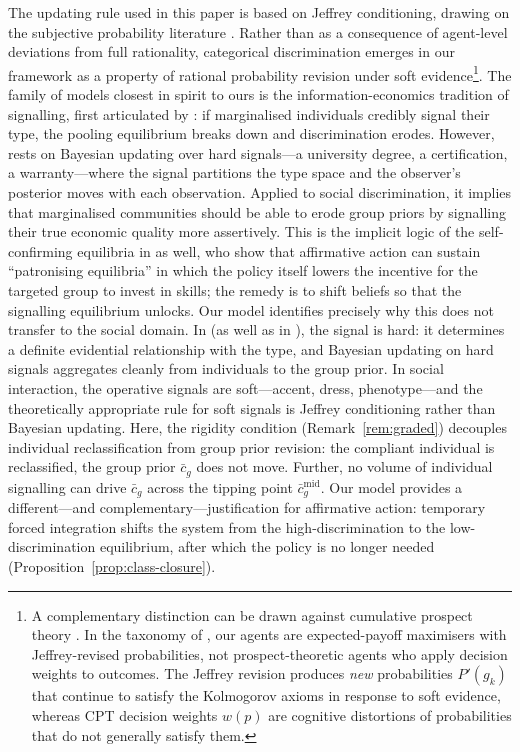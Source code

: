 \documentclass[pdflatex,sn-basic]{sn-jnl}
\theoremstyle{thmstyleone}
\numberwithin{proposition}{subsection}
\begin{document}
The updating rule used in this paper is based on Jeffrey
conditioning, drawing on the subjective probability literature
\citep{Jeffrey1965,Jeffrey2004}. Rather than as a consequence of
agent-level deviations from full rationality, categorical
discrimination emerges in our framework as a property of rational
probability revision under soft evidence\footnote{A complementary
distinction can be drawn against cumulative prospect theory
\citep{TverskyKahneman1992}. In the taxonomy of
\citet{Schoemaker1982}, our agents are expected-payoff maximisers
with Jeffrey-revised probabilities, not prospect-theoretic agents who
apply decision weights to outcomes. The Jeffrey revision produces
\emph{new} probabilities $P'(g_k)$ that continue to satisfy the
Kolmogorov axioms in response to soft evidence, whereas CPT decision
weights $w(p)$ are cognitive distortions of probabilities that do not
generally satisfy them.}.
The family of models closest in spirit to ours is the
information-economics tradition of signalling, first articulated by
\citet{Spence1973}: if marginalised individuals credibly signal their
type, the pooling equilibrium breaks down and discrimination erodes.
However, \citet{Spence1973} rests on Bayesian updating over hard
signals---a university degree, a certification, a warranty---where the
signal partitions the type space and the observer's posterior moves
with each observation. Applied to social discrimination, it implies
that marginalised communities should be able to erode group priors by
signalling their true economic quality more assertively. This is the
implicit logic of the self-confirming equilibria in
\citet{CoateLoury1993} as well, who show that affirmative action can
sustain ``patronising equilibria'' in which the policy itself lowers
the incentive for the targeted group to invest in skills; the remedy
is to shift beliefs so that the signalling equilibrium unlocks. Our
model identifies precisely why this does not transfer to the social
domain. In \citet{Spence1973} (as well as in \citet{Akerlof1970}),
the signal is hard: it determines a definite evidential relationship
with the type, and Bayesian updating on hard signals aggregates
cleanly from individuals to the group prior. In social interaction,
the operative signals are soft---accent, dress, phenotype---and the theoretically appropriate rule for soft signals is
Jeffrey conditioning rather than Bayesian updating. Here, the rigidity condition
(Remark~\ref{rem:graded}) decouples individual reclassification
from group prior revision: the compliant individual is reclassified,
the group prior $\bar{c}_g$ does not move. Further, no volume of individual
signalling can drive $\bar{c}_g$ across the tipping point
$\bar{c}_g^{\mathrm{mid}}$. Our model provides a
different---and complementary---justification for affirmative action:
temporary forced integration shifts the system from the
high-discrimination to the low-discrimination equilibrium, after
which the policy is no longer needed
(Proposition~\ref{prop:class-closure}).
\end{document}
